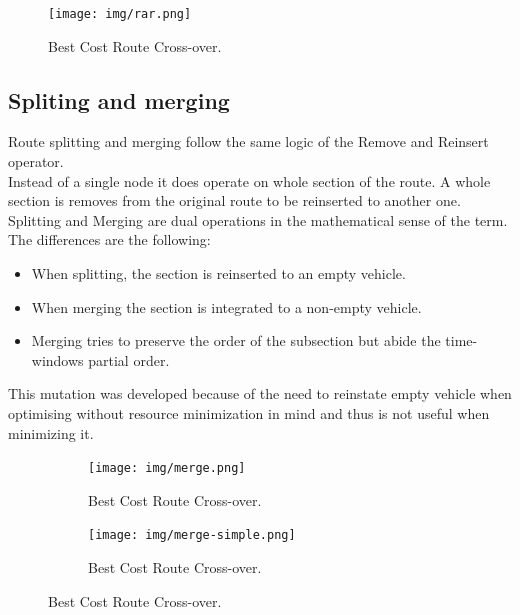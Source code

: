 \documentclass[12pt]{memoir}
\begin{document}
\begin{figure}[htbp]
	\begin{center}
		\texttt{[image: img/rar.png]}
		\caption{Best Cost Route Cross-over.}
	\end{center}
\end{figure}

\subsection{Spliting and merging}
Route splitting and merging follow the same logic of the Remove and Reinsert operator.\\
Instead of a single node it does operate on whole section of the route. A whole section
is removes from the original route to be reinserted to another one. Splitting and Merging are
dual operations in the mathematical sense of the term.\\
The differences are the following:
\begin{itemize}
  \item When splitting, the section is reinserted to an empty vehicle.
  \item When merging the section is integrated to a non-empty vehicle.
  \item Merging tries to preserve the order of the subsection but abide the time-windows partial order.
\end{itemize}
This mutation was developed because of the need to reinstate empty vehicle when optimising without
resource minimization in mind and thus is not useful when minimizing it.

\begin{figure}[htbp]
\centering
	\begin{subfigure}{.5\textwidth}
                        \centering
			\texttt{[image: img/merge.png]}
			\caption{Best Cost Route Cross-over.}
	
	\end{subfigure}%
	\begin{subfigure}{.5\textwidth}
                        \centering
			\texttt{[image: img/merge-simple.png]}
			\caption{Best Cost Route Cross-over.}

	\end{subfigure}
\end{figure}
\end{document}
